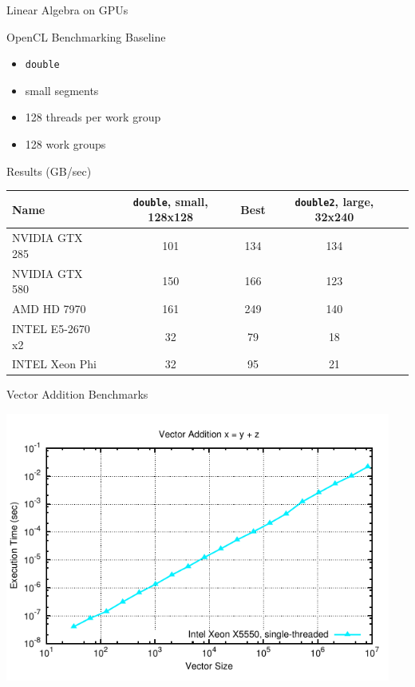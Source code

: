 \begin{frame}{Linear Algebra on GPUs}

 \begin{block}{OpenCL Benchmarking Baseline}
  \begin{itemize}
   \item \lstinline|double|
   \item small segments
   \item 128 threads per work group
   \item 128 work groups
  \end{itemize}
 \end{block}

 \begin{block}{Results (GB/sec)} 
  \begin{center}
  \begin{tabular}{|l|c|c|c|c|}
   \hline
   Name           & \footnotesize\lstinline|double|, small, 128x128 & \footnotesize Best & \footnotesize \lstinline|double2|, large, 32x240 \\
   \hline
   NVIDIA GTX 285   & 101 & 134 & 134 \\
   NVIDIA GTX 580   & 150 & 166 & 123 \\
   AMD HD 7970      & 161 & 249 & 140 \\
   INTEL E5-2670 x2 &  32 &  79 &  18 \\
   INTEL Xeon Phi   &  32 &  95 &  21  \\
   \hline
  \end{tabular}
  \end{center}
 \end{block}

\end{frame}






\begin{frame}{Vector Addition Benchmarks}
  \begin{center}
   \includegraphics[width=0.95\textwidth]{figures/vector-timings-1}
  \end{center}
\end{frame}

